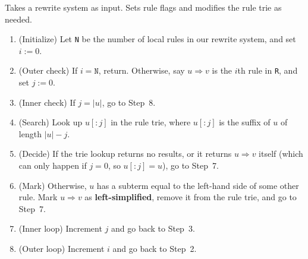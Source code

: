 \documentclass[../generics]{subfiles}
\begin{document}
\begin{algorithm}\label{left simplification}
Takes a rewrite system as input. Sets rule flags and modifies the rule trie as needed.
\begin{enumerate}
\item (Initialize) Let \texttt{N} be the number of local rules in our rewrite system, and set $i:=0$.
\item (Outer check) If $i=\texttt{N}$, return. Otherwise, say $u\Rightarrow v$ is the $i$th rule in \texttt{R}, and set $j:=0$.
\item (Inner check) If $j=|u|$, go to Step~8.
\item (Search) Look up $u[:j]$ in the rule trie, where $u[:j]$ is the suffix of $u$ of length $|u|-j$.
\item (Decide) If the trie lookup returns no results, or it returns $u\Rightarrow v$ itself (which can only happen if $j=0$, so $u[:j]=u$), go to Step~7.
\item (Mark) Otherwise, $u$ has a subterm equal to the left-hand side of some other rule. Mark $u\Rightarrow v$ as \textbf{left-simplified}, remove it from the rule trie, and go to Step~7.
\item (Inner loop) Increment $j$ and go back to Step~3.
\item (Outer loop) Increment $i$ and go back to Step~2.
\end{enumerate}
\end{algorithm}
\end{document}
